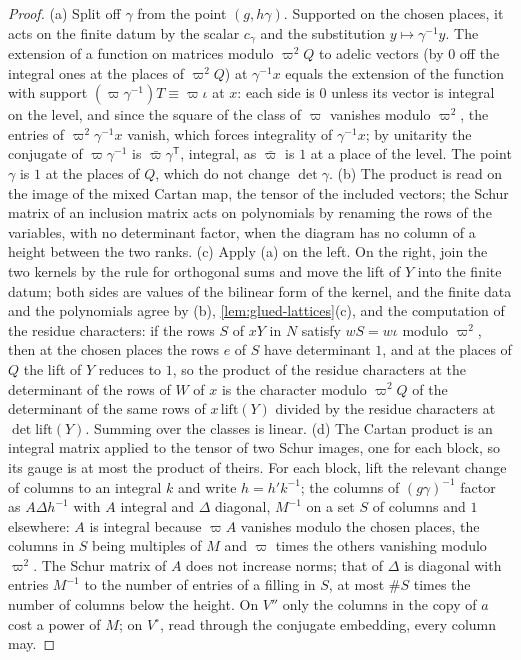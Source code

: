 \begin{proof}
(a) Split off $\gamma$ from the point $(g,h\gamma)$. Supported on the chosen places, it acts on the finite datum by the scalar $c_\gamma$ and the substitution $y\mapsto\gamma^{-1}y$. The extension of a function on matrices modulo $\varpi^2Q$ to adelic vectors (by $0$
off the integral ones at the places of $\varpi^2Q$) at $\gamma^{-1}x$ equals the extension of the function with support $(\varpi\gamma^{-1})T\equiv\varpi\iota$ at $x$: each side is $0$ unless its vector is integral on the level, and since the square of the class of $\varpi$
vanishes modulo $\varpi^2$, the entries of $\varpi^2\gamma^{-1}x$ vanish, which forces integrality of $\gamma^{-1}x$; by unitarity the conjugate of $\varpi\gamma^{-1}$ is $\bar\varpi\gamma^{\mathsf T}$, integral, as $\bar\varpi$ is $1$ at a place of the level. The point $\gamma$ is
$1$ at the places of $Q$, which do not change $\det\gamma$. (b) The product is read on the image of the mixed Cartan map, the tensor of the included vectors; the Schur matrix of an inclusion matrix acts on polynomials by renaming the rows of
the variables, with no determinant factor, when the diagram has no column of a height between the two ranks. (c) Apply (a) on the left. On the right, join the two kernels by the rule for orthogonal sums and move the lift of $Y$ into the finite
datum; both sides are values of the bilinear form of the kernel, and the finite data and the polynomials agree by (b), \cref{lem:glued-lattices}(c), and the computation of the residue characters: if the rows $S$ of $xY$ in $N$ satisfy
$wS=w\iota$ modulo $\varpi^2$, then at the chosen places the rows $e$ of $S$ have determinant $1$, and at the places of $Q$ the lift of $Y$ reduces to $1$, so the product of the residue characters at the determinant of the rows of $W$ of $x$ is the
character modulo $\varpi^2Q$ of the determinant of the same rows of $x\,\mathrm{lift}(Y)$ divided by the residue characters at $\det\mathrm{lift}(Y)$. Summing over the classes is linear. (d) The Cartan product is an integral matrix applied to the tensor of two Schur
images, one for each block, so its gauge is at most the product of theirs. For each block, lift the relevant change of columns to an integral $k$ and write $h=h'k^{-1}$; the columns of $(g\gamma)^{-1}$ factor as $A\Delta h^{-1}$ with $A$ integral and $\Delta$ diagonal, $M^{-1}$ on a
set $S$ of columns and $1$ elsewhere: $A$ is integral because $\varpi A$ vanishes modulo the chosen places, the columns in $S$ being multiples of $M$ and $\varpi$ times the others vanishing modulo $\varpi^2$. The Schur matrix of $A$ does not increase norms;
that of $\Delta$ is diagonal with entries $M^{-1}$ to the number of entries of a filling in $S$, at most $\#S$ times the number of columns below the height. On $V''$ only the columns in the copy of $a$ cost a power of $M$; on $V^\circ$, read through the
conjugate embedding, every column may.
\end{proof}

